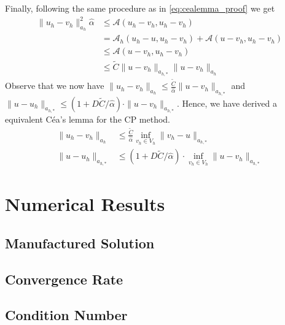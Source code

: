 Finally, following the same procedure as in \eqref{eq:cealemma_proof} we get
\[
    \begin{split}
\| u_{h} - v_{h} \|_{a_{h}  }^{2  } \hat{\alpha } & \le  \mathcal{A} \left( u_{h} - v_{h}, u_{h} - v_{h} \right) \\
& =  \mathcal{A} _{h} \left( u_{h} -u, u_{h} -v_{h} \right) + \mathcal{A} \left( u - v_{h}, u_{h} - v_{h} \right) \\
 &  \le  \mathcal{A}  \left( u - v_{h}, u_{h} - v_{h} \right)   \\
 &\le  \widetilde{C} \| u - v_{h} \|_{ a_{h,*} }^{  } \| u- v_{h} \|_{ a_{h} }^{  }
    \end{split}
\]
Observe that we now have $ \| u_{h} - v_{h} \|_{ a_{h} }^{  }   \le \frac{\widetilde{C}}{\hat{\alpha }}  \| u - v_{h} \|_{ a_{h, *} }^{  }$ and $\| u - u_{h} \|_{ a_{h,*} }^{  }   \le \left( 1 + D \widetilde{C} /\hat{\alpha } \right)\cdot  \| u - v_{h} \|_{ a_{h,*} }^{  } $. Hence, we have derived a equivalent Céa's lemma for the CP method.
\[
    \begin{split}
\| u_{h} - v_{h} \|_{ a_{h} }^{  }  & \le \frac{\widetilde{C}}{\hat{\alpha }}  \inf_{v_{h} \in  V_{h}} \|  v_{h} - u \|_{ a_{h, *} }^{  } \\
\| u - u_{h} \|_{ a_{h,*} }^{  }  & \le \left( 1 + D \widetilde{C} /\hat{\alpha } \right)\cdot \inf_{v_{h} \in  V_{h}}   \| u - v_{h} \|_{ a_{h,*} }^{  }
    \end{split}
\]


\newpage
\section{Numerical Results}%
\label{sec:numerical_results}

\subsection{Manufactured Solution}%
\label{sub:manufactured_solution}

\subsection{Convergence Rate}%
\label{sub:convergence_rate}

\subsection{Condition Number}%
\label{sub:condition_number}



